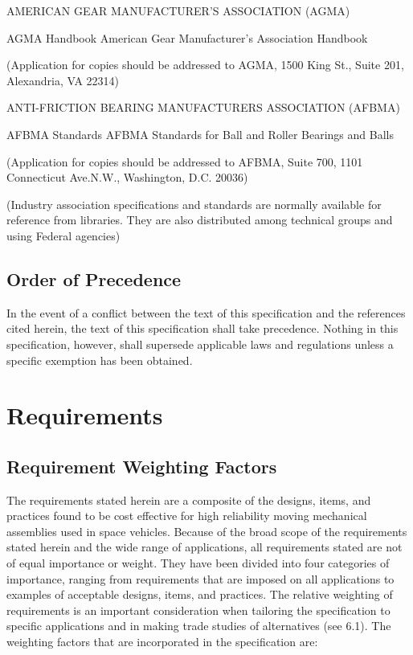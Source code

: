 \documentclass[12pt]{article}
\begin{document}
AMERICAN GEAR MANUFACTURER'S ASSOCIATION (AGMA)

AGMA Handbook American Gear Manufacturer's Association Handbook

(Application for copies should be addressed to AGMA, 1500 King
St., Suite 201, Alexandria, VA 22314)

ANTI-FRICTION BEARING MANUFACTURERS ASSOCIATION (AFBMA)

AFBMA Standards AFBMA Standards for Ball and Roller Bearings and Balls

(Application for copies should be addressed to AFBMA, Suite 700, 1101 Connecticut Ave.N.W., Washington, D.C. 20036)

(Industry association specifications and standards are normally available for reference from libraries. 
They are also distributed among technical groups and using Federal agencies)

\subsection{Order of Precedence} %
In the event of a conflict between the text of this specification and the references cited herein, the text of this specification shall take precedence. 
Nothing in this specification, however, shall supersede applicable laws and regulations unless a specific exemption has been obtained.

\section{Requirements} %

\subsection{Requirement Weighting Factors} %
The requirements stated herein are a composite of the designs, items, and practices found to be cost effective for high reliability moving mechanical assemblies used in space vehicles. 
Because of the broad scope of the requirements stated herein and the wide range of applications, all requirements stated are not of equal importance or weight. 
They have been divided into four categories of importance, ranging from requirements that are imposed on all applications to examples of acceptable designs, items, and practices. 
The relative weighting of requirements is an important consideration when tailoring the specification to specific applications and in making trade studies of alternatives (see 6.1). 
The weighting factors that are incorporated in the specification are:
\end{document}
